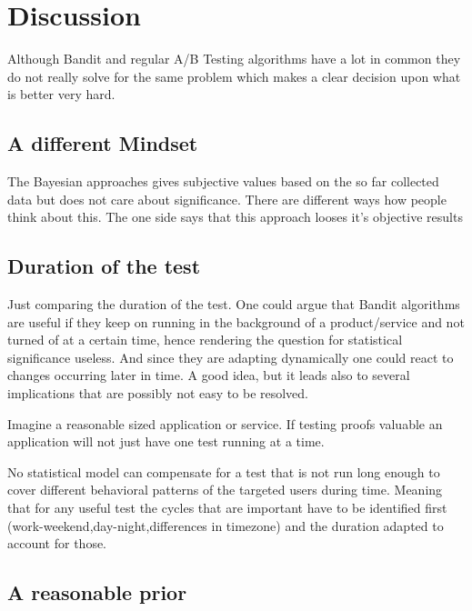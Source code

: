 \documentclass[main.tex]{subfiles}
\begin{document}
\chapter{Discussion}
Although Bandit and regular A/B Testing algorithms have a lot in common they do not really solve for the same problem which makes a clear decision upon what is better very hard.
\section{A different Mindset}
The Bayesian approaches gives subjective values based on the so far collected data but does not care about significance. There are different ways how people think about this. The one side says that this approach looses it's objective results 

\section{Duration of the test}
Just comparing the duration of the test. One could argue that Bandit algorithms are useful if they keep on running in the background of a product/service and not turned of at a certain time, hence rendering the question for statistical significance useless. And since they are adapting dynamically one could react to changes occurring later in time. A good idea, but it leads also to several implications that are possibly not easy to be resolved. 

Imagine a reasonable sized application or service. If testing proofs valuable an application will not just have one test running at a time. 

No statistical model can compensate for a test that is not run long enough to cover different behavioral patterns of the targeted users during time. Meaning that for any useful test the cycles that are important have to be identified first (work-weekend,day-night,differences in timezone) and the duration adapted to account for those.

\section{A reasonable prior}
\end{document}
